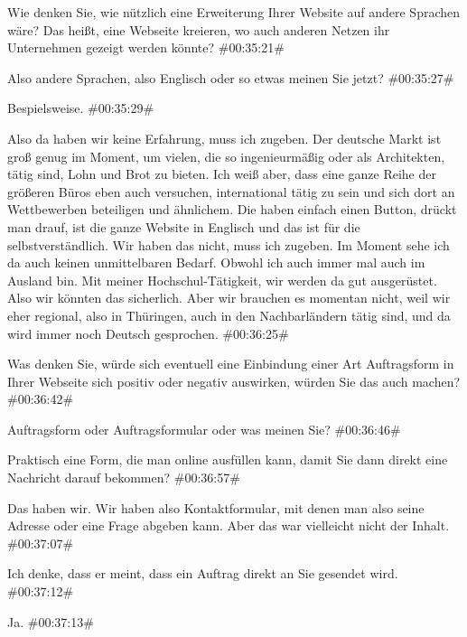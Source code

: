\begin{description}
\Toni Wie denken Sie, wie nützlich eine Erweiterung Ihrer Website auf andere Sprachen wäre? Das heißt, eine Webseite kreieren, wo auch anderen Netzen ihr Unternehmen gezeigt werden könnte? \#00:35:21\#

\Andre Also andere Sprachen, also Englisch oder so etwas meinen Sie jetzt? \#00:35:27\#

\Toni Bespielsweise. \#00:35:29\#

\Andre Also da haben wir keine Erfahrung, muss ich zugeben. Der deutsche Markt ist groß genug im Moment, um vielen, die so ingenieurmäßig oder als Architekten, tätig sind, Lohn und Brot zu bieten. Ich weiß aber, dass eine ganze Reihe der größeren Büros eben auch versuchen, international tätig zu sein und sich dort an Wettbewerben beteiligen und ähnlichem. Die haben einfach einen Button, drückt man drauf, ist die ganze Website in Englisch und das ist für die selbstverständlich. Wir haben das nicht, muss ich zugeben. Im Moment sehe ich da auch keinen unmittelbaren Bedarf. Obwohl ich auch immer mal auch im Ausland bin. Mit meiner Hochschul-Tätigkeit, wir werden da gut ausgerüstet. Also wir könnten das sicherlich. Aber wir brauchen es momentan nicht, weil wir eher regional, also in Thüringen, auch in den Nachbarländern tätig sind, und da wird immer noch Deutsch gesprochen. \#00:36:25\#

\Toni Was denken Sie, würde sich eventuell eine Einbindung einer Art Auftragsform in Ihrer Webseite sich positiv oder negativ auswirken, würden Sie das auch machen? \#00:36:42\#

\Andre Auftragsform oder Auftragsformular oder was meinen Sie? \#00:36:46\#

\Toni Praktisch eine Form, die man online ausfüllen kann, damit Sie dann direkt eine Nachricht darauf bekommen? \#00:36:57\#

\Andre Das haben wir. Wir haben also Kontaktformular, mit denen man also seine Adresse oder eine Frage abgeben kann. Aber das war vielleicht nicht der Inhalt. \#00:37:07\#

\Fabian Ich denke, dass er meint, dass ein Auftrag direkt an Sie gesendet wird. \#00:37:12\#

\Toni Ja. \#00:37:13\#


\end{description}
